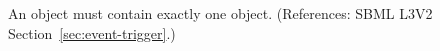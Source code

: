 An \Event object must contain exactly one \Trigger object.  (References:
SBML L3V2 Section~\ref{sec:event-trigger}.)
